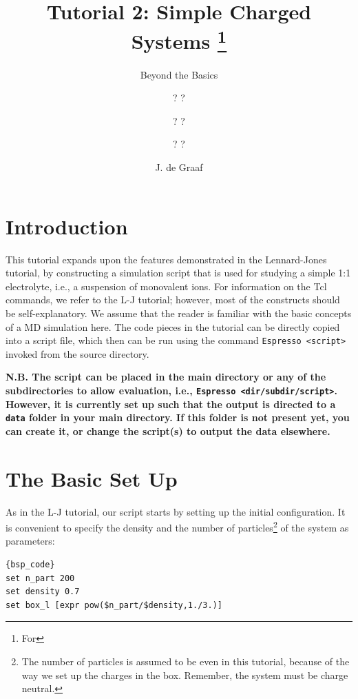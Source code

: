 \documentclass[
a4paper,                        %
11pt,                           %
twoside,                        %
footsepline,                    %
headsepline,                    %
headexclude,                    %
footexclude,                    %
pagesize,                       %
]{scrartcl}
\begin{document}
\esptitlehead

\title{Tutorial 2: Simple Charged Systems%
\ifdefined\esversion%
\thanks{For \es \esversion}%
\fi%
}
\subtitle{Beyond the \es{} Basics}
\author{? ? \and ? ? \and ? ? \and J. de Graaf}

\maketitle
\tableofcontents

\section{Introduction}

This tutorial expands upon the \es{} features demonstrated in the Lennard-Jones tutorial, by constructing a simulation script that is used for studying a simple 1:1 electrolyte, i.e., a suspension of monovalent ions. For information on the Tcl commands, we refer to the L-J tutorial; however, most of the constructs should be self-explanatory. We assume that the reader is familiar with the basic concepts of a MD simulation here. The code pieces in the tutorial can be directly copied into a script file, which then can be run using the command \verb|Espresso <script>| invoked from the \es{} source directory.

\textbf{N.B. The script can be placed in the \es{} main directory or any of the subdirectories to allow evaluation, i.e., \texttt{Espresso <dir/subdir/script>}. However, it is currently set up such that the output is directed to a \texttt{data} folder in your \es{} main directory. If this folder is not present yet, you can create it, or change the script(s) to output the data elsewhere.}

\section{The Basic Set Up}

As in the L-J tutorial, our script starts by setting up the initial configuration. It is convenient to specify the density and the number of particles\footnote{The number of particles is assumed to be even in this tutorial, because of the way we set up the charges in the box. Remember, the system must be charge neutral.} of the system as parameters:

{\small\vspace{0,2cm}
\begin{lstlisting}{bsp_code}
set n_part 200
set density 0.7
set box_l [expr pow($n_part/$density,1./3.)]
\end{lstlisting}\vspace{0,2cm}
}
\end{document}
